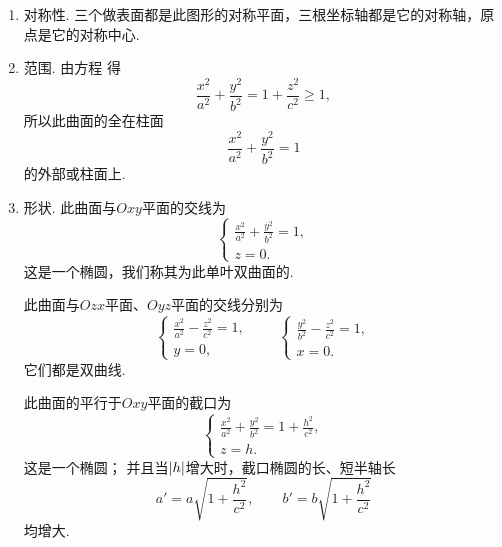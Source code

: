 \begin{enumerate}
	\item 对称性.
	三个做表面都是此图形的对称平面，三根坐标轴都是它的对称轴，原点是它的对称中心.

	\item 范围.
	由方程  得\begin{equation*}
		\frac{x^2}{a^2}+\frac{y^2}{b^2}=1+\frac{z^2}{c^2}\geq1,
	\end{equation*}
	所以此曲面的全在柱面\begin{equation*}
		\frac{x^2}{a^2}+\frac{y^2}{b^2}=1
	\end{equation*}的外部或柱面上.

	\item 形状.
	此曲面与\(Oxy\)平面的交线为\begin{equation*}
		\left\{ \begin{array}{l}
			\frac{x^2}{a^2}+\frac{y^2}{b^2}=1, \\
			z = 0.
		\end{array} \right.
	\end{equation*}
	这是一个椭圆，我们称其为此单叶双曲面的.

	此曲面与\(Ozx\)平面、\(Oyz\)平面的交线分别为\begin{equation*}
		\left\{ \begin{array}{l}
			\frac{x^2}{a^2}-\frac{z^2}{c^2}=1, \\
			y = 0,
		\end{array} \right.
		\qquad
		\left\{ \begin{array}{l}
			\frac{y^2}{b^2}-\frac{z^2}{c^2}=1, \\
			x = 0.
		\end{array} \right.
	\end{equation*}
	它们都是双曲线.

	此曲面的平行于\(Oxy\)平面的截口为\begin{equation*}
		\left\{ \begin{array}{l}
			\frac{x^2}{a^2}+\frac{y^2}{b^2}=1+\frac{h^2}{c^2}, \\
			z = h.
		\end{array} \right.
	\end{equation*}
	这是一个椭圆；
	并且当\(\abs{h}\)增大时，截口椭圆的长、短半轴长\begin{equation*}
		a' = a \sqrt{1+\frac{h^2}{c^2}}, \qquad
		b' = b \sqrt{1+\frac{h^2}{c^2}}
	\end{equation*}均增大.


\end{enumerate}
